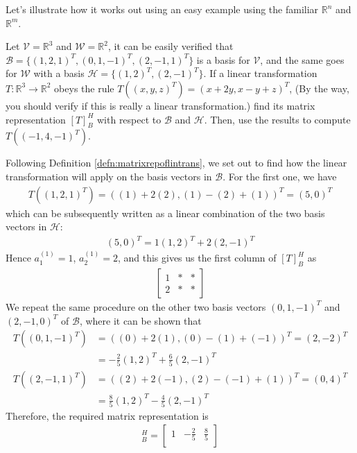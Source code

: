 Let's illustrate how it works out using an easy example using the familiar $\mathbb{R}^n$ and $\mathbb{R}^m$. 
\begin{exmp}
\label{exmp:lineartransmatrixrep}
Let $\mathcal{V} = \mathbb{R}^3$ and $\mathcal{W} = \mathbb{R}^2$, it can be easily verified that $\mathcal{B} = \{(1,2,1)^T, (0,1,-1)^T, (2,-1,1)^T\}$ is a basis for $\mathcal{V}$, and the same goes for $\mathcal{W}$ with a basis $\mathcal{H} = \{(1,2)^T, (2,-1)^T\}$. If a linear transformation $T: \mathbb{R}^3 \to \mathbb{R}^2$ obeys the rule $T((x,y,z)^T) = (x+2y, x-y+z)^T$, (By the way, you should verify if this is really a linear transformation.) find its matrix representation $[T]_B^H$ with respect to $\mathcal{B}$ and $\mathcal{H}$. Then, use the results to compute $T((-1,4,-1)^T)$.
\end{exmp}
\begin{solution}
Following Definition \ref{defn:matrixrepoflintrans}, we set out to find how the linear transformation will apply on the basis vectors in $\mathcal{B}$. For the first one, we have
\begin{align*}
T((1,2,1)^T) = ((1)+2(2), (1)-(2)+(1))^T = (5,0)^T
\end{align*}
which can be subsequently written as a linear combination of the two basis vectors in $\mathcal{H}$:
\begin{align*}
(5,0)^T = 1(1,2)^T + 2(2,-1)^T
\end{align*}
Hence $a_1^{(1)} = 1$, $a_2^{(1)} = 2$, and this gives us the first column of $[T]_B^H$ as
\begin{align*}
\begin{bmatrix}
1 & * & * \\
2 & * & * 
\end{bmatrix}
\end{align*}
We repeat the same procedure on the other two basis vectors $(0,1,-1)^T$ and $(2,-1,0)^T$ of $\mathcal{B}$, where it can be shown that
\begin{align*}
T((0,1,-1)^T) &= ((0)+2(1), (0)-(1)+(-1))^T = (2,-2)^T \\
&= -\frac{2}{5}(1,2)^T + \frac{6}{5}(2,-1)^T \\
T((2,-1,1)^T) &= ((2)+2(-1), (2)-(-1)+(1))^T = (0,4)^T \\
&= \frac{8}{5}(1,2)^T - \frac{4}{5}(2,-1)^T
\end{align*}
Therefore, the required matrix representation is
\begin{align*}
[T]_B^H = 
\begin{bmatrix}
1 & -\frac{2}{5} & \frac{8}{5} \\

\end{bmatrix}
\end{align*}
\end{solution}
